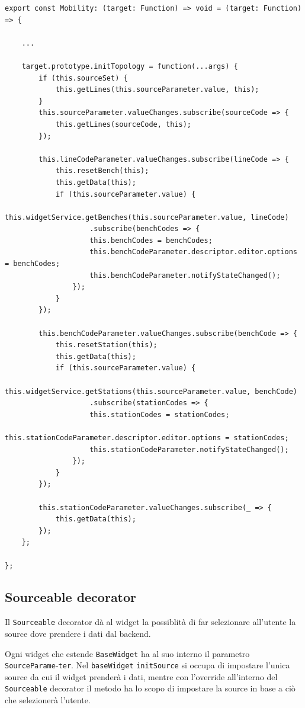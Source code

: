 \begin{lstlisting}[caption={Metodo initTopology all'interno del decorator Mobility}, style=javaScriptCode]
export const Mobility: (target: Function) => void = (target: Function) => {

    ...

    target.prototype.initTopology = function(...args) {
        if (this.sourceSet) {
            this.getLines(this.sourceParameter.value, this);
        }
        this.sourceParameter.valueChanges.subscribe(sourceCode => {
            this.getLines(sourceCode, this);
        });

        this.lineCodeParameter.valueChanges.subscribe(lineCode => {
            this.resetBench(this);
            this.getData(this);
            if (this.sourceParameter.value) {
                this.widgetService.getBenches(this.sourceParameter.value, lineCode)
                    .subscribe(benchCodes => {
                    this.benchCodes = benchCodes;
                    this.benchCodeParameter.descriptor.editor.options = benchCodes;
                    this.benchCodeParameter.notifyStateChanged();
                });
            }
        });

        this.benchCodeParameter.valueChanges.subscribe(benchCode => {
            this.resetStation(this);
            this.getData(this);
            if (this.sourceParameter.value) {
                this.widgetService.getStations(this.sourceParameter.value, benchCode)
                    .subscribe(stationCodes => {
                    this.stationCodes = stationCodes;
                    this.stationCodeParameter.descriptor.editor.options = stationCodes;
                    this.stationCodeParameter.notifyStateChanged();
                });
            }
        });

        this.stationCodeParameter.valueChanges.subscribe(_ => {
            this.getData(this);
        });
    };

};
\end{lstlisting}

\subsection{Sourceable decorator}
Il \verb|Sourceable| decorator dà al widget la possiblità di far selezionare all'utente la source dove prendere i dati dal backend.

Ogni widget che estende \verb|BaseWidget| ha al suo interno il parametro \verb|SourceParame|-\verb|ter|. Nel \verb|baseWidget| \verb|initSource| si occupa di impostare l'unica source da cui il widget prenderà i dati, mentre con l'override all'interno del \verb|Sourceable| decorator il metodo ha lo scopo di impostare la source in base a ciò che selezionerà l'utente.

